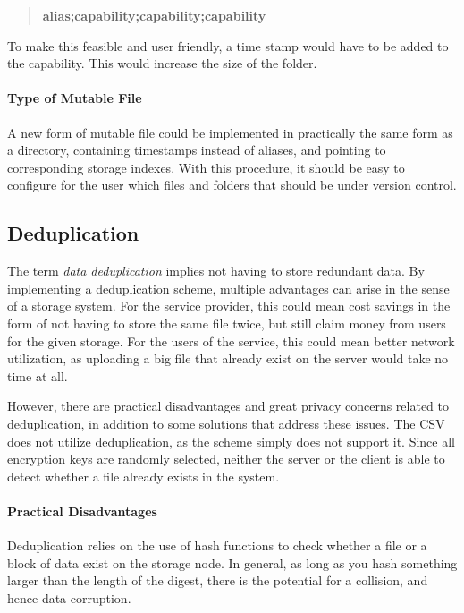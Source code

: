 \documentclass[pdftex,english,10pt,b5paper,twoside]{book}
\begin{document}
\begin{quote}
    \centering
    \textbf{alias;capability;capability;capability}
\end{quote}

To make this feasible and user friendly, a time stamp would have to be added to
the capability. This would increase the size of the folder.

\paragraph{Type of Mutable File} A new form of mutable file could be
implemented in practically the same form as a directory, containing timestamps
instead of aliases, and pointing to corresponding storage indexes. With this
procedure, it should be easy to configure for the user which files and folders
that should be under version control.

\subsection{Deduplication}

The term \emph{data deduplication} implies not having to store redundant data.
By implementing a deduplication scheme, multiple advantages can arise in the
sense of a storage system. For the service provider, this could mean cost
savings in the form of not having to store the same file twice, but still claim
money from users for the given storage. For the users of the service, this
could mean better network utilization, as uploading a big file that already
exist on the server would take no time at all.

However, there are practical disadvantages and great privacy concerns related
to deduplication, in addition to some solutions that address these issues.
The \ac{CSV} does not utilize deduplication, as the scheme simply does not
support it. Since all encryption keys are randomly selected, neither the server
or the client is able to detect whether a file already exists in the system.

\paragraph{Practical Disadvantages} Deduplication relies on the use of hash
functions to check whether a file or a block of data exist on the storage node.
In general, as long as you hash something larger than the length of the digest,
there is the potential for a collision, and hence data corruption.
\end{document}
